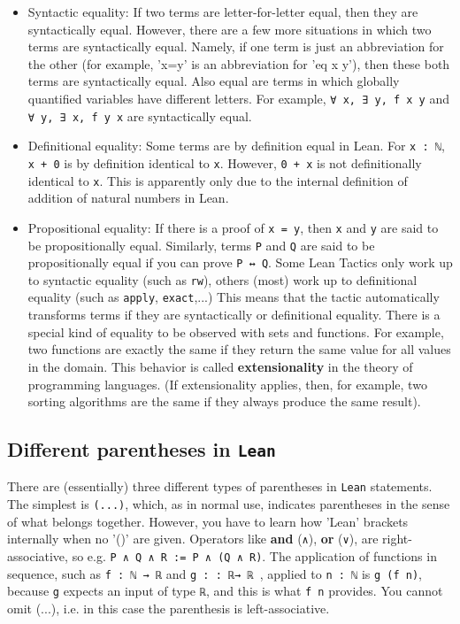 \documentclass{memoir}
\begin{document}
\begin{itemize}
\item Syntactic equality: If two terms are letter-for-letter equal, then they are syntactically equal. However, there are a few more situations in which two terms are syntactically equal. Namely, if one term is just an abbreviation for the other (for example, 'x=y' is an abbreviation for 'eq x y'), then these both terms are syntactically equal. Also equal are terms in which globally quantified variables have different letters. For example, \Verb|∀ x, ∃ y, f x y| and \Verb|∀ y, ∃ x, f y x| are syntactically equal.\item Definitional equality: Some terms are by definition equal in Lean. For \Verb|x : ℕ|, \Verb|x + 0| is by definition identical to \Verb|x|. However, \Verb|0 + x| is not   definitionally identical to \Verb|x|. This is apparently only due to the     internal definition of addition of natural numbers in Lean.\item Propositional equality: If there is a proof of \Verb|x = y|, then \Verb|x| and \Verb|y| are said to be propositionally equal. Similarly, terms \Verb|P| and \Verb|Q| are said to be propositionally equal if you can prove \Verb|P ↔ Q|. Some Lean Tactics only work up to syntactic equality (such as \Verb|rw|), others (most) work up to definitional equality (such as \Verb|apply|, \Verb|exact|,...) This means that the tactic automatically transforms terms if they are syntactically or definitional equality. There is a special kind of equality to be observed with sets and functions. For example, two functions are exactly the same if they return the same value for all values in the domain. This behavior is called \textbf{extensionality} in the theory of programming languages. (If extensionality applies, then, for example, two sorting algorithms are the same if they always produce the same result).
\end{itemize}




\subsection{Different parentheses in \Verb|Lean|}

There are (essentially) three different types of parentheses in \Verb|Lean| statements. The simplest is \Verb|(...)|, which, as in normal use, indicates parentheses in the sense of what belongs together. However, you have to learn how 'Lean' brackets internally when no '()' are given. Operators like \textbf{and} (\Verb|∧|), \textbf{or} (\Verb|∨|), are right-associative, so e.g. \Verb|P ∧ Q ∧ R := P ∧ (Q ∧ R)|. The application of functions in sequence, such as \Verb|f : ℕ → ℝ| and \Verb|g : : ℝ→ ℝ |, applied to \Verb|n : ℕ| is \Verb|g (f n)|, because \Verb|g| expects an input of type \Verb|ℝ|, and this is what \Verb|f n| provides. You cannot omit (...), i.e. in this case the parenthesis is left-associative.
\end{document}
